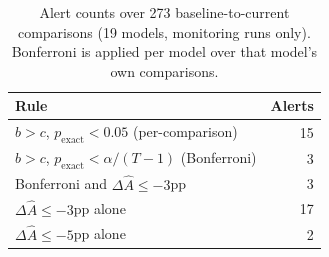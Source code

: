 \begin{table}[htbp]
    \centering
    \caption{Alert counts over 273 baseline-to-current comparisons
    (19 models, monitoring runs only). Bonferroni is applied
    per model over that model's own comparisons.}
    \label{tab:alert-counts}
    \begin{tabular}{lr}
    \toprule
    Rule & Alerts \\
    \midrule
    $b>c$, $p_{\mathrm{exact}}<0.05$ (per-comparison)        & 15 \\
    $b>c$, $p_{\mathrm{exact}}<\alpha/(T-1)$ (Bonferroni)    & 3 \\
    Bonferroni and $\Delta\widehat{A}\le-3$pp                 & 3 \\
    \midrule
    $\Delta\widehat{A}\le-3$pp alone                          & 17 \\
    $\Delta\widehat{A}\le-5$pp alone                          & 2 \\
    \bottomrule
    \end{tabular}
\end{table}
